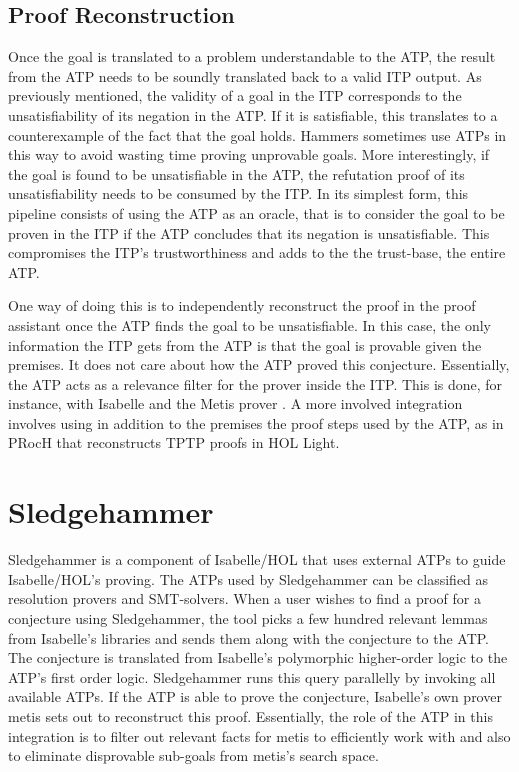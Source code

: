 \documentclass{article}
\begin{document}
		\subsection{Proof Reconstruction}
		Once the goal is translated to a problem understandable 
		to the ATP, the result from the ATP needs to be 
		soundly translated back to a valid ITP output.
		As previously mentioned, the validity of a goal in 
		the ITP corresponds to the unsatisfiability of its 
		negation in the ATP. If it is satisfiable, this 
		translates to a counterexample of the fact that 
		the goal holds. Hammers sometimes use ATPs 
		in this way to avoid wasting time proving 
		unprovable goals. More interestingly, if the 
		goal is found to be unsatisfiable in the ATP, 
		the refutation proof of its unsatisfiability
		needs to be consumed by the ITP. In its simplest form,
		this pipeline consists of using the ATP as an oracle, 
		that is to consider the goal to be proven in the 
		ITP if the ATP concludes that its negation is 
		unsatisfiable. This compromises the ITP's 
		trustworthiness and adds to the the trust-base, 
		the entire ATP.
		
		One way of doing this is to independently reconstruct 
		the proof in the proof assistant once the ATP finds 
		the goal to be unsatisfiable. In this case, the 
		only information the ITP gets from the ATP is that 
		the goal is provable given the premises. It does 
		not care about how the ATP proved this conjecture.
		Essentially, the ATP acts as a relevance filter for 
		the prover inside the ITP. This is done, for instance, 
		with Isabelle and the Metis prover 
		\cite{10.1007/978-3-540-74591-4_18}. A more involved
		integration involves using in addition to the premises
		the proof steps used by the ATP, as in PRocH
		\cite{10.1007/978-3-642-38574-2_18} that reconstructs 
		TPTP proofs in HOL Light.
		
\section{Sledgehammer}
\label{sec:sledgehammer}
		Sledgehammer is a component of Isabelle/HOL that uses 
	external ATPs to guide Isabelle/HOL's proving. The ATPs 
	used by Sledgehammer can be classified as resolution 
	provers and SMT-solvers. When a user wishes to 
	find a proof for a conjecture using Sledgehammer, 
	the tool picks a few hundred relevant 
	lemmas from Isabelle's libraries and sends them along 
	with the conjecture to the ATP. The conjecture is 
	translated from Isabelle's polymorphic higher-order 
	logic to the ATP's first order logic. Sledgehammer 
	runs this query parallelly by invoking all available 
	ATPs. If the ATP is able to prove the conjecture, 
	Isabelle's own prover metis sets out to reconstruct 
	this proof. Essentially, the role of the 
	ATP in this integration is to filter out relevant 
	facts for metis to efficiently work with and 
	also to eliminate disprovable sub-goals from 
	metis's search space.
	
\end{document}
